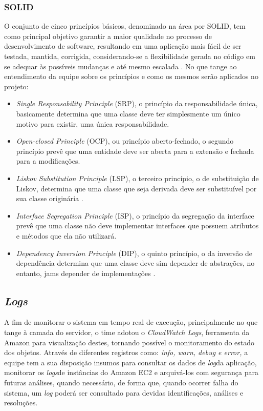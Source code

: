 \documentclass[
    12pt,               %
    openright,          %
    oneside,
    a4paper,            %
    BIBLATEX,           %
    TODO,               %
    english,            %
    brazil              %
    ]{ifsp-spo-inf-ctds}
\begin{document}
    \subsubsection{SOLID}
    O conjunto de cinco princípios básicos, denominado na área por SOLID, tem como principal objetivo garantir a maior qualidade no processo de desenvolvimento de software, resultando em uma aplicação mais fácil de ser testada, mantida, corrigida, considerando-se a flexibilidade gerada no código em se adequar às possíveis mudanças e até mesmo escalada . No que tange ao entendimento da equipe sobre os princípios e como os mesmos serão aplicados no projeto:

    \begin{itemize}
        \item 
        \emph{Single Responsability Principle} (SRP), o princípio da responsabilidade única, basicamente determina que uma classe deve ter simplesmente um único motivo para existir, uma única responsabilidade.
        \item 
         \emph{Open-closed Principle} (OCP), ou princípio aberto-fechado, o segundo princípio prevê que uma entidade deve ser aberta para a extensão e fechada para a modificações.
        \item 
        \emph{Liskov Substitution Principle} (LSP), o terceiro
        princípio, o de substituição de Liskov, determina que uma classe que seja derivada deve ser substituível por sua classe originária .
        \item 
        \emph{Interface Segregation Principle} (ISP), o princípio da segregação da interface prevê que uma classe não deve implementar interfaces que possuem atributos e métodos que ela não utilizará.
        \item 
        \emph{Dependency Inversion Principle} (DIP), o quinto princípio, o da inversão de dependência determina que uma classe deve sim depender de abstrações, no entanto, jams depender de implementações .
    \end{itemize}        

        \subsection{\emph{Logs}}
        A fim de monitorar o sistema em tempo real de execução, principalmente no que tange à camada do servidor, o time adotou o \emph{CloudWatch Logs}, ferramenta da Amazon para visualização destes, tornando possível o monitoramento do estado dos objetos. Através de diferentes registros como: \emph{info, warn, debug e error,} a equipe tem a sua disposição insumos para consultar os dados de \emph{log}da aplicação, monitorar os \emph{logs}de instâncias do Amazon EC2 e arquivá-los com segurança para futuras análises, quando necessário, de forma que, quando ocorrer falha do sistema, um \emph{log} poderá ser consultado para devidas identificações, análises e resoluções.
\end{document}
